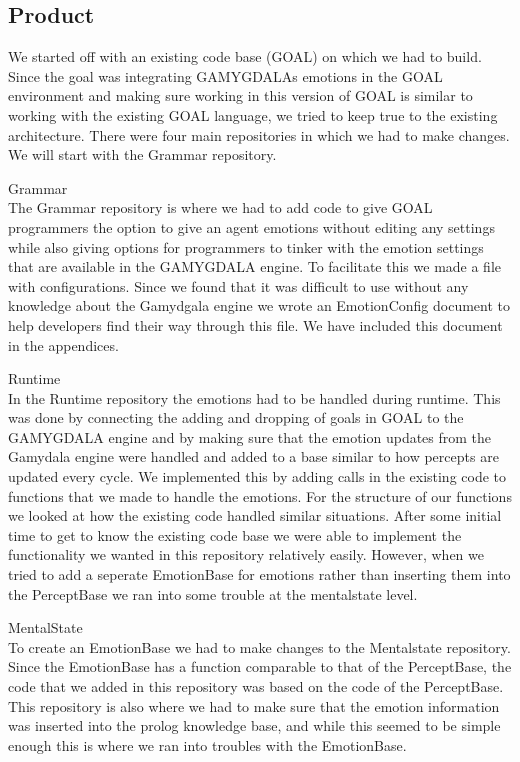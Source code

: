 \documentclass[11pt]{article}
\begin{document}
\subsection{Product}
We started off with an existing code base (GOAL\cite{GOAL}) on which we had to build. Since the goal was integrating GAMYGDALAs emotions in the GOAL environment and making sure working in this version of GOAL is similar to working with the existing GOAL language, we tried to keep true to the existing architecture. There were four main repositories in which we had to make changes. We will start with the Grammar repository.\par
Grammar\\
The Grammar repository is where we had to add code to give GOAL programmers the option to give an agent emotions without editing any settings while also giving options for programmers to tinker with the emotion settings that are available in the GAMYGDALA engine. To facilitate this we made a file with configurations. Since we found that it was difficult to use without any knowledge about the Gamydgala engine we wrote an EmotionConfig document to help developers find their way through this file. We have included this document in the appendices. \par
Runtime\\ 
In the Runtime repository the emotions had to be handled during runtime. This was done by connecting the adding and dropping of goals in GOAL to the GAMYGDALA engine and by making sure that the emotion updates from the Gamydala engine were handled and added to a base similar to how percepts are updated every cycle. We implemented this by adding calls in the existing code to functions that we made to handle the emotions. For the structure of our functions we looked at how the existing code handled similar situations. After some initial time to get to know the existing code base we were able to implement the functionality we wanted in this repository relatively easily. However, when we tried to add a seperate EmotionBase for emotions rather than inserting them into the PerceptBase we ran into some trouble at the mentalstate level. \par 
MentalState\\
To create an EmotionBase we had to make changes to the Mentalstate repository. Since the EmotionBase has a function comparable to that of the PerceptBase, the code that we added in this repository was based on the code of the PerceptBase. This repository is also where we had to make sure that the emotion information was inserted into the prolog knowledge base, and while this seemed to be simple enough this is where we ran into troubles with the EmotionBase. \par 
\end{document}
